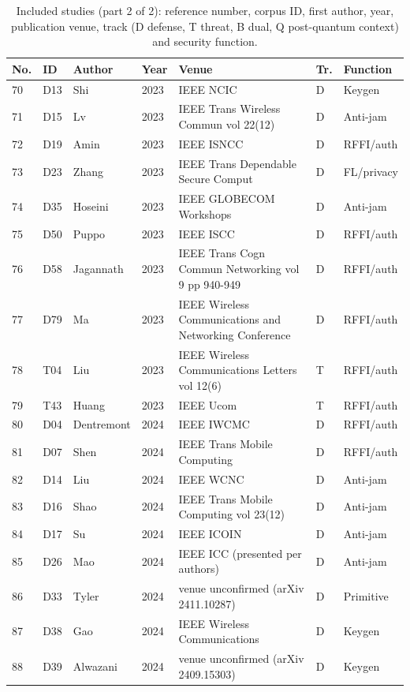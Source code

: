 \begin{table}[p]
\centering
\scriptsize
\setlength{\tabcolsep}{2.5pt}
\caption{Included studies (part 2 of 2): reference number, corpus ID, first author, year, publication venue, track (D defense, T threat, B dual, Q post-quantum context) and security function.}
\label{tab:corpusb}
\begin{tabular}{@{}lllll>{\raggedright\arraybackslash}p{3.3cm}>{\raggedright\arraybackslash}p{1.9cm}@{}}
\toprule
No. & ID & Author & Year & Venue & Tr. & Function \\
\midrule
70 & D13 & Shi & 2023 & IEEE NCIC & D & Keygen \\
71 & D15 & Lv & 2023 & IEEE Trans Wireless Commun vol 22(12) & D & Anti-jam \\
72 & D19 & Amin & 2023 & IEEE ISNCC & D & RFFI/auth \\
73 & D23 & Zhang & 2023 & IEEE Trans Dependable Secure Comput & D & FL/privacy \\
74 & D35 & Hoseini & 2023 & IEEE GLOBECOM Workshops & D & Anti-jam \\
75 & D50 & Puppo & 2023 & IEEE ISCC & D & RFFI/auth \\
76 & D58 & Jagannath & 2023 & IEEE Trans Cogn Commun Networking vol 9 pp 940-949 & D & RFFI/auth \\
77 & D79 & Ma & 2023 & IEEE Wireless Communications and Networking Conference & D & RFFI/auth \\
78 & T04 & Liu & 2023 & IEEE Wireless Communications Letters vol 12(6) & T & RFFI/auth \\
79 & T43 & Huang & 2023 & IEEE Ucom & T & RFFI/auth \\
80 & D04 & Dentremont & 2024 & IEEE IWCMC & D & RFFI/auth \\
81 & D07 & Shen & 2024 & IEEE Trans Mobile Computing & D & RFFI/auth \\
82 & D14 & Liu & 2024 & IEEE WCNC & D & Anti-jam \\
83 & D16 & Shao & 2024 & IEEE Trans Mobile Computing vol 23(12) & D & Anti-jam \\
84 & D17 & Su & 2024 & IEEE ICOIN & D & Anti-jam \\
85 & D26 & Mao & 2024 & IEEE ICC (presented per authors) & D & Anti-jam \\
86 & D33 & Tyler & 2024 & venue unconfirmed (arXiv 2411.10287) & D & Primitive \\
87 & D38 & Gao & 2024 & IEEE Wireless Communications & D & Keygen \\
88 & D39 & Alwazani & 2024 & venue unconfirmed (arXiv 2409.15303) & D & Keygen \\

\end{tabular}
\end{table}
